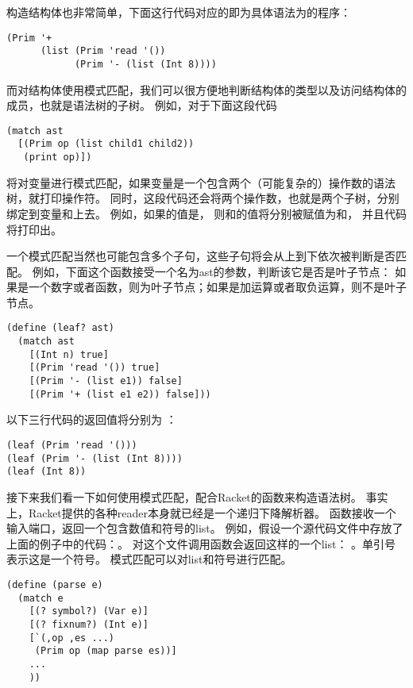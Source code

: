 构造结构体也非常简单，下面这行代码对应的即为具体语法为的程序：
\begin{lstlisting}
(Prim '+
      (list (Prim 'read '())
            (Prim '- (list (Int 8))))
\end{lstlisting}

而对结构体使用模式匹配，我们可以很方便地判断结构体的类型以及访问结构体的成员，也就是语法树的子树。
例如，对于下面这段代码
\begin{lstlisting}
(match ast
  [(Prim op (list child1 child2))
   (print op)])
\end{lstlisting}
将对变量进行模式匹配，如果变量是一个包含两个（可能复杂的）操作数的语法树，就打印操作符。
同时，这段代码还会将两个操作数，也就是两个子树，分别绑定到变量和上去。
例如，如果的值是，
则和的值将分别被赋值为和，
并且代码将打印出\code{+}。

一个模式匹配当然也可能包含多个子句，这些子句将会从上到下依次被判断是否匹配。
例如，下面这个函数接受一个名为ast的参数，判断该它是否是叶子节点：
如果是一个数字或者函数，则为叶子节点；如果是加运算或者取负运算，则不是叶子节点。
\begin{lstlisting}
(define (leaf? ast)
  (match ast
    [(Int n) true]
    [(Prim 'read '()) true]
    [(Prim '- (list e1)) false]
    [(Prim '+ (list e1 e2)) false]))
\end{lstlisting}

以下三行代码的返回值将分别为 ：
\begin{lstlisting}
(leaf (Prim 'read '()))
(leaf (Prim '- (list (Int 8))))
(leaf (Int 8))
\end{lstlisting}

接下来我们看一下如何使用模式匹配，配合Racket的函数来构造语法树。
事实上，Racket提供的各种reader本身就已经是一个递归下降解析器。
函数接收一个输入端口，返回一个包含数值和符号的list。
例如，假设一个源代码文件中存放了上面的例子中的代码：。
对这个文件调用函数会返回这样的一个list：
。单引号表示这是一个符号。
模式匹配可以对list和符号进行匹配。

\begin{lstlisting}
(define (parse e)
  (match e
    [(? symbol?) (Var e)]
    [(? fixnum?) (Int e)]
    [`(,op ,es ...)
     (Prim op (map parse es))]
    ...
    ))
\end{lstlisting}

